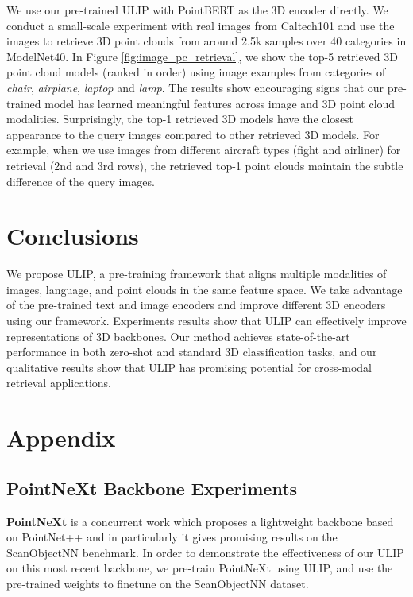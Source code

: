 \documentclass[10pt,twocolumn,letterpaper]{article}
\begin{document}
We use our pre-trained ULIP with PointBERT as the 3D encoder directly. We conduct a small-scale experiment with real images from Caltech101 \cite{fei2004learning} and use the images to retrieve 3D point clouds from around 2.5k samples over 40 categories in ModelNet40. In Figure \ref{fig:image_pc_retrieval}, we show the top-5 retrieved 3D point cloud models (ranked in order) using image examples from categories of \emph{chair}, \emph{airplane}, \emph{laptop} and \emph{lamp}. The results show encouraging signs that our pre-trained model has learned meaningful features across image and 3D point cloud modalities. Surprisingly, the top-1 retrieved 3D models have the closest appearance to the query images compared to other retrieved 3D models. For example, when we use images from different aircraft types (fight and airliner) for retrieval (2nd and 3rd rows), the retrieved top-1 point clouds maintain the subtle difference of the query images.


\section{Conclusions}
\label{sec:conclusion}
We propose ULIP, a pre-training framework that aligns multiple modalities of images, language, and point clouds in the same feature space. We take advantage of the pre-trained text and image encoders and improve different 3D encoders using our framework. Experiments results show that ULIP can effectively improve representations of 3D backbones. Our method achieves state-of-the-art performance in both zero-shot and standard 3D classification tasks, and our qualitative results show that ULIP has promising potential for cross-modal retrieval applications.













{\small


}

\clearpage

\appendix

\section{Appendix}
\label{sec:appendix}

\subsection{PointNeXt Backbone Experiments}
\noindent\textbf{PointNeXt}\cite{qian2022pointnext} is a concurrent work which proposes a lightweight backbone based on PointNet++ and in particularly it gives promising results on the ScanObjectNN benchmark. In order to demonstrate the effectiveness of our ULIP on this most recent backbone, we pre-train PointNeXt using ULIP, and use the pre-trained weights to finetune on the ScanObjectNN dataset.
\end{document}
